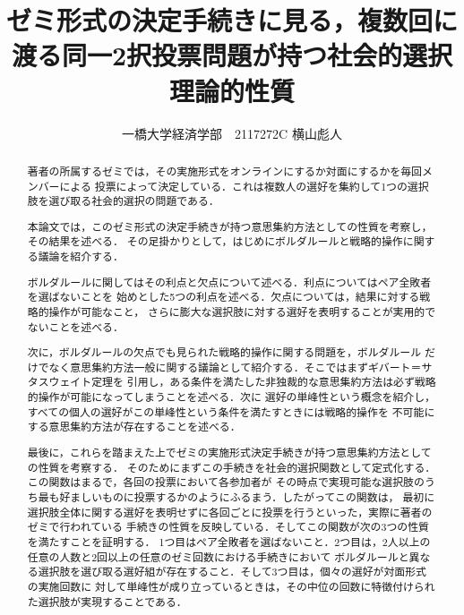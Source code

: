 \documentclass[dvipdfmx]{jsarticle}
\begin{document}
\title{ゼミ形式の決定手続きに見る，複数回に渡る同一2択投票問題が持つ社会的選択理論的性質}
\author{一橋大学経済学部　2117272C 横山彪人}
\date{}
\maketitle

\vfill
\begin{abstract}
  著者の所属するゼミでは，その実施形式をオンラインにするか対面にするかを毎回メンバーによる
  投票によって決定している．これは複数人の選好を集約して1つの選択肢を選び取る社会的選択の問題である．
  
  本論文では，このゼミ形式の決定手続きが持つ意思集約方法としての性質を考察し，その結果を述べる．
  その足掛かりとして，はじめにボルダルールと戦略的操作に関する議論を紹介する．
  
  ボルダルールに関してはその利点と欠点について述べる．利点についてはペア全敗者を選ばないことを
  始めとした5つの利点を述べる．欠点については，結果に対する戦略的操作が可能なこと，
  さらに膨大な選択肢に対する選好を表明することが実用的でないことを述べる．
  
  次に，ボルダルールの欠点でも見られた戦略的操作に関する問題を，ボルダルール
  だけでなく意思集約方法一般に関する議論として紹介する．そこではまずギバート＝サタスウェイト定理を
  引用し，ある条件を満たした非独裁的な意思集約方法は必ず戦略的操作が可能になってしまうことを述べる．次に
  選好の単峰性という概念を紹介し，すべての個人の選好がこの単峰性という条件を満たすときには戦略的操作を
  不可能にする意思集約方法が存在することを述べる．
  
  最後に，これらを踏まえた上でゼミの実施形式決定手続きが持つ意思集約方法としての性質を考察する．
  そのためにまずこの手続きを社会的選択関数として定式化する．この関数はまるで，各回の投票において各参加者が
  その時点で実現可能な選択肢のうち最も好ましいものに投票するかのようにふるまう．したがってこの関数は，
  最初に選択肢全体に関する選好を表明せずに各回ごとに投票を行うといった，実際に著者のゼミで行われている
  手続きの性質を反映している．そしてこの関数が次の3つの性質を満たすことを証明する．
  1つ目はペア全敗者を選ばないこと．2つ目は，2人以上の任意の人数と2回以上の任意のゼミ回数における手続きにおいて
  ボルダルールと異なる選択肢を選び取る選好組が存在すること．そして3つ目は，個々の選好が対面形式の実施回数に
  対して単峰性が成り立っているときは，その中位の回数に特徴付けられた選択肢が実現することである．\\
\end{abstract}
\vfill
\end{document}
